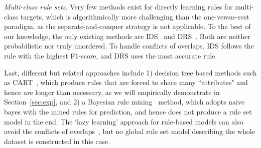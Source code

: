 \smallskip \noindent
\emph{Multi-class rule sets.}
Very few methods exist for directly learning rules for multi-class targets, which is algorithmically more challenging than the one-versus-rest paradigm, as the separate-and-conquer strategy is not applicable. 
To the best of our knowledge, the only existing methods are IDS~\citep{lakkaraju2016interpretable} and DRS~\citep{zhang2020diverseRuleSets}. Both are neither probabilistic nor truly unordered. To handle conflicts of overlaps, IDS follows the rule with the highest F1-score, and DRS uses the most accurate rule. 

Last, different but related approaches include 1) decision tree based methods such as CART~\citep{breiman1984classification}, which produce rules that are forced to share many ``attributes" and hence are longer than necessary, as we will empirically demonstrate in Section~\ref{sec:exp}, and 2) a Bayesian rule mining~\citep{gay2012bayesian} method, which adopts naive bayes  with the mined rules for prediction, and hence does not produce a rule set model in the end. The `lazy learning' approach for rule-based models can also avoid the conflicts of overlaps~\citep{veloso2006lazy}, but no global rule set model describing the whole dataset is constructed in this case.



